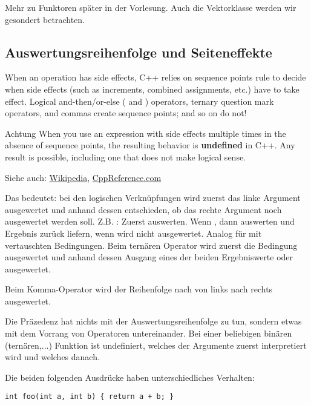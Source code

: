 {Mehr zu Funktoren später in der Vorlesung. Auch die Vektorklasse werden wir gesondert betrachten.

\subsection*{Auswertungsreihenfolge und Seiteneffekte}
When an operation has side effects, C++ relies on sequence points rule to decide when side effects (such as increments, combined assignments, etc.) have to take effect. Logical and-then/or-else (\cpp{&&} and \cpp{||}) operators, ternary  question mark operators, and commas \cpp{,} create sequence points; \cpp{+, -, <<} and so on do not!

\begin{guideline}{Achtung}
When you use an expression with side effects multiple times in the absence of sequence points, the resulting behavior is \textbf{undefined} in C++. Any result is possible, including one that does not make logical sense.
\end{guideline}

Siehe auch: \href{http://en.wikipedia.org/wiki/Sequence_point}{Wikipedia}, \href{http://en.cppreference.com/w/cpp/language/eval_order}{CppReference.com}

Das bedeutet: bei den logischen Verknüpfungen wird zuerst das linke Argument ausgewertet und anhand dessen entschieden, ob das rechte Argument noch ausgewertet werden soll. Z.B. : Zuerst  auswerten. Wenn , dann  auswerten und Ergebnis zurück liefern, wenn  wird  nicht ausgewertet. Analog für  mit vertauschten Bedingungen. Beim ternären Operator  wird zuerst die Bedingung  ausgewertet und anhand dessen Ausgang eines der beiden Ergebniswerte  oder  ausgewertet.

Beim Komma-Operator wird der Reihenfolge nach von links nach rechts ausgewertet.

\begin{rem}
Die Präzedenz hat nichts mit der Auswertungsreihenfolge zu tun, sondern etwas mit dem Vorrang von Operatoren untereinander. Bei einer beliebigen binären (ternären,...) Funktion ist undefiniert, welches der Argumente zuerst interpretiert wird und welches danach.
\end{rem}

\begin{example}
Die beiden folgenden Ausdrücke haben unterschiedliches Verhalten:
\begin{verbatim}
int foo(int a, int b) { return a + b; }


\end{verbatim}
\end{example}}
